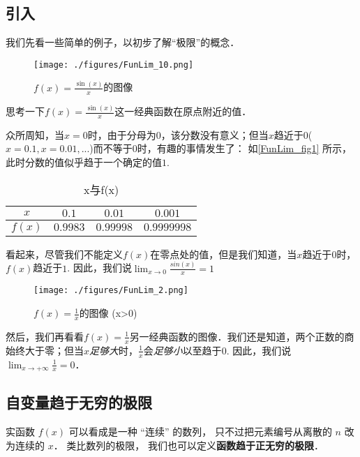 

\subsection{引入}
我们先看一些简单的例子，以初步了解“极限”的概念．
\begin{example}{}\label{FunLim_ex1}

\begin{figure}[ht]
\centering
\texttt{[image: ./figures/FunLim\_10.png]}
\caption{$f(x)=\frac{\sin(x)}{x}$的图像} \label{FunLim_fig1}
\end{figure}
思考一下$f(x)=\frac{\sin(x)}{x}$这一经典函数在原点附近的值．

众所周知，当$x=0$时，由于分母为$0$，该分数没有意义；但当$x$趋近于$0$($x=0.1,x=0.01,...$)而不等于$0$时，有趣的事情发生了： 如\autoref{FunLim_fig1} 所示，此时分数的值似乎趋于一个确定的值$1$.

\begin{table}[ht]
\centering
\caption{x与f(x)}\label{FunLim_tab1}
\begin{tabular}{|c|c|c|c|}
\hline
$x$ & $0.1$ & $0.01$ & $0.001$ \\
\hline
$f(x)$ & $0.9983$ & $0.99998$ & $0.9999998$ \\
\hline
\end{tabular}
\end{table}
看起来，尽管我们不能定义$f(x)$在零点处的值，但是我们知道，当$x$趋近于$0$时，$f(x)$趋近于$1$. 因此，我们说$\lim_{x\to0}\frac{sin(x)}{x}=1$
\end{example}

\begin{example}{}
\begin{figure}[ht]
\centering
\texttt{[image: ./figures/FunLim\_2.png]}
\caption{$f(x)=\frac{1}{x}$的图像 (x>0)} \label{FunLim_fig2}
\end{figure}
然后，我们再看看$f(x)=\frac{1}{x}$另一经典函数的图像．我们还是知道，两个正数的商始终大于零；但当$x$\textsl{足够大}时，$\frac{1}{x}$会\textsl{足够小}以至趋于$0$. 因此，我们说$\lim_{x\to+\infty}\frac{1}{x}=0$．
\end{example}

\subsection{自变量趋于无穷的极限}
实函数 $f(x)$ 可以看成是一种 “连续” 的数列， 只不过把元素编号从离散的 $n$ 改为连续的 $x$． 类比数列的极限， 我们也可以定义\textbf{函数趋于正无穷的极限}．

